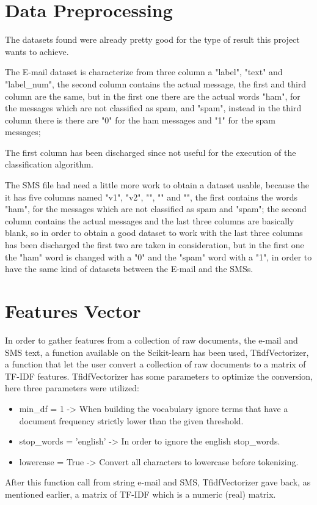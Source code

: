 \documentclass[a4paper]{report}
\begin{document}
\section{Data Preprocessing}
The datasets found were already pretty good for the type of result this project wants to achieve.

\noindent The E-mail dataset is characterize from three column a "label", "text" and "label\_num", the second column contains the actual message, the first and third column are the same, but in the first one there are the actual words "ham", for the messages which are not classified as spam, and "spam",  instead in the third column there is there are "0" for the ham messages and "1" for the spam messages;

\noindent The first column has been discharged since not useful for the execution of the classification algorithm.

\noindent The SMS file had need a little more work to obtain a dataset usable, because the it has five columns named "v1", "v2", "", "" and "", the first contains the words "ham", for the messages which are not classified as spam and "spam"; the second column contains the actual messages and the last three columns are basically blank, so in order to obtain a good dataset to work with the last three columns has been discharged the first two are taken in consideration, but in the first one the "ham" word is changed with a "0" and the "spam" word with a "1", in order to have the same kind of datasets between the E-mail and the SMSs.

\section{Features Vector}
In order to gather features from a collection of raw documents, the e-mail and SMS text, a function available on the Scikit-learn has been used, TfidfVectorizer, a function that let the user convert a collection of raw documents to a matrix of TF-IDF features. TfidfVectorizer has some parameters to optimize the conversion, here three parameters were utilized:

\newpage
\begin{itemize}
	\item min\_df = 1 -> When building the vocabulary ignore terms that have a document frequency strictly lower than the given threshold.
	\item stop\_words = 'english' -> In order to ignore the english stop\_words.
	\item lowercase = True -> Convert all characters to lowercase before tokenizing.
\end{itemize}
After this function call from string e-mail and SMS, TfidfVectorizer gave back, as mentioned earlier, a matrix of TF-IDF which is a numeric (real) matrix.
\end{document}
